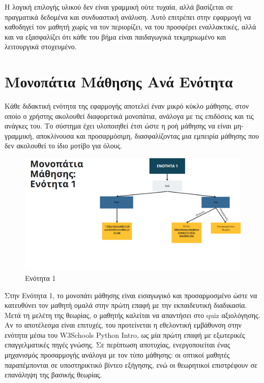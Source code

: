 \documentclass[11pt]{report}
\begin{document}
Η λογική επιλογής υλικού δεν είναι γραμμική ούτε τυχαία, αλλά βασίζεται σε πραγματικά δεδομένα και συνδυαστική ανάλυση. Αυτό επιτρέπει στην εφαρμογή να καθοδηγεί τον μαθητή χωρίς να τον περιορίζει, να του προσφέρει εναλλακτικές, αλλά και να εξασφαλίζει ότι κάθε του βήμα είναι παιδαγωγικά τεκμηριωμένο και λειτουργικά στοχευμένο.

\section{Μονοπάτια Μάθησης Ανά Ενότητα}

Κάθε διδακτική ενότητα της εφαρμογής αποτελεί έναν μικρό κύκλο μάθησης, στον οποίο ο χρήστης ακολουθεί διαφορετικά μονοπάτια, ανάλογα με τις επιδόσεις και τις ανάγκες του. Το σύστημα έχει υλοποιηθεί έτσι ώστε η ροή μάθησης να είναι μη-γραμμική, αποκλίνουσα και προσαρμόσιμη, διασφαλίζοντας μια εμπειρία μάθησης που δεν ακολουθεί το ίδιο μοτίβο για όλους. 

\begin{figure}[H]
    \centering
    \includegraphics[width=0.9\linewidth]{Figures/image006.png}
    \caption{Ενότητα 1}
    \label{fig:enter-label}
\end{figure}

Στην Ενότητα 1, το μονοπάτι μάθησης είναι εισαγωγικό και προσαρμοσμένο ώστε να κατευθύνει τον μαθητή ομαλά στην πρώτη επαφή με την εκπαιδευτική διαδικασία. Μετά τη μελέτη της θεωρίας, ο μαθητής καλείται να απαντήσει στο quiz αξιολόγησης. Αν το αποτέλεσμα είναι επιτυχές, του προτείνεται η εθελοντική εμβάθυνση στην ενότητα μέσω του W3Schools Python Intro, ως μία πρώτη επαφή με εξωτερικές επαγγελματικές πηγές γνώσης. Σε περίπτωση αποτυχίας, ενεργοποιείται ένας μηχανισμός προσαρμογής ανάλογα με τον τύπο μάθησης: οι οπτικοί μαθητές παραπέμπονται σε υποστηρικτικό βίντεο εξήγησης, ενώ οι θεωρητικοί επιστρέφουν σε επανάληψη της βασικής θεωρίας. 
\end{document}
